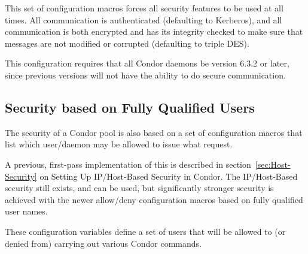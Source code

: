 This set of configuration macros forces all security features
to be used at all times.
All communication is authenticated (defaulting to Kerberos),
and all communication is both encrypted and has its
integrity checked to make sure that messages
are not modified or corrupted (defaulting to triple DES).

This configuration requires that all Condor daemons be
version 6.3.2 or later, since previous versions will not have
the ability to do secure communication.

\subsection{\label{sec:Security-FQU}Security based on Fully Qualified Users}

The security of a Condor pool is also based on a set of configuration
macros that list which user/daemon may be allowed to issue what request.

A previous, first-pass implementation of this is described in
section~\ref{sec:Host-Security}
on Setting Up IP/Host-Based Security in Condor.
The IP/Host-Based security still exists, and can be used,
but significantly stronger security is achieved with the newer allow/deny 
configuration macros based on fully qualified user names.

These configuration variables define a set of users that will be
allowed to (or denied from) carrying out various Condor commands.


